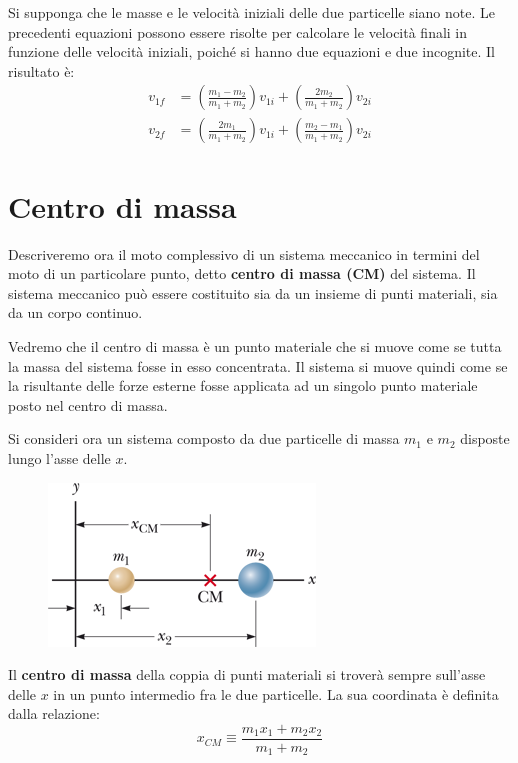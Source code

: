 \documentclass[a4paper,11pt,oneside]{book}
\begin{document}
Si supponga che le masse e le velocità iniziali delle due particelle siano note. Le precedenti equazioni possono essere risolte per calcolare le velocità finali in funzione delle velocità iniziali,
poiché si hanno due equazioni e due incognite. Il risultato è:
\begin{align*}
    v_{1f} &= \left( \frac{m_1 - m_2}{m_1 + m_2} \right) v_{1i} + \left( \frac{2m_2}{m_1 + m_2} \right) v_{2i} \\
    v_{2f} &= \left( \frac{2m_1}{m_1 + m_2} \right) v_{1i} + \left( \frac{m_2 - m_1}{m_1 + m_2} \right) v_{2i}
\end{align*}

\section{Centro di massa}
Descriveremo ora il moto complessivo di un sistema meccanico in termini del moto di un particolare punto, detto \textbf{centro di massa (CM)} del sistema.
Il sistema meccanico può essere costituito sia da un insieme di punti materiali, sia da un corpo continuo.

Vedremo che il centro di massa è un punto materiale che si muove come se tutta la massa del sistema fosse in esso concentrata. Il sistema si muove quindi come se la risultante delle forze esterne fosse applicata ad un singolo punto materiale posto nel centro di massa.

Si consideri ora un sistema composto da due particelle di massa $m_1$ e $m_2$ disposte lungo l'asse delle $x$.
\begin{figure}[h]
    \includegraphics[scale=1]{centro_di_massa_asse_x.png}
    \centering
\end{figure}
Il \textbf{centro di massa} della coppia di punti materiali si troverà sempre sull'asse delle $x$ in un punto intermedio fra le due particelle. La sua coordinata è definita dalla relazione:
\begin{equation*}
    x_{CM} \equiv \frac{m_1x_1 + m_2x_2}{m_1 + m_2}
\end{equation*}
\end{document}
